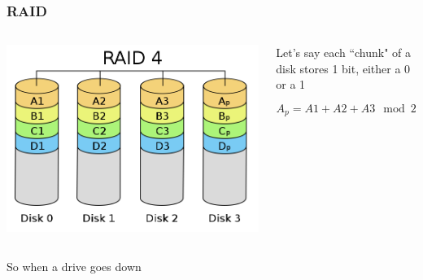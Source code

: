 \documentclass{beamer}
\theoremstyle{mystyle}
\begin{document}

\begin{frame}
\frametitle{RAID}

\begin{columns}
		\begin{center}
			\vspace{-1in}
			\includegraphics[scale=0.15]{raid4}	
		\end{center}
		\begin{center}
		Let's say each ``chunk" of a disk stores 1 bit, either a 0 or a 1
		
		\[A_p = A1 + A2 + A3 \mod 2\]

		\end{center}
\end{columns}
So when a drive goes down 
\end{frame}

\end{document}
